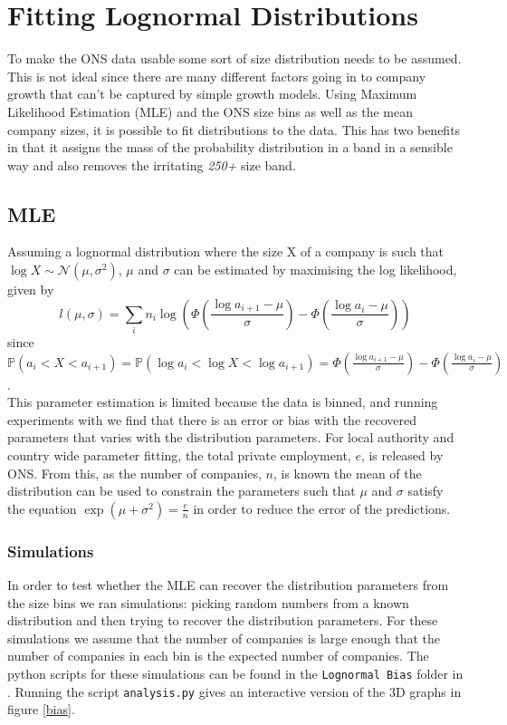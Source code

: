 \documentclass[a4paper,10pt]{article}
\begin{document}
   \section{Fitting Lognormal Distributions}
   To make the ONS data usable some sort of size distribution needs to be assumed. This is not ideal since there are many different factors going in to company growth that can't be captured by simple growth models. Using Maximum Likelihood Estimation (MLE) and the ONS size bins as well as the mean company sizes, it is possible to fit distributions to the data. This has two benefits in that it assigns the mass of the probability distribution in a band in a sensible way and also removes the irritating \emph{250+} size band.
   
   \subsection{MLE}
  
   Assuming a lognormal distribution where the size X of a company is such that $\log X \sim \mathcal{N}(\mu, \sigma^2)$, $\mu$ and $\sigma$ can be estimated by maximising the log likelihood, given by
   \begin{equation}
   l(\mu, \sigma) = \sum_i n_i \log \left( \Phi \left( \frac{\log a_{i + 1} - \mu}{\sigma} \right) - \Phi \left( \frac{\log a_{i} - \mu}{\sigma} \right) \right)
   \end{equation}
   since $\mathbb{P}(a_i < X < a_{i + 1}) = \mathbb{P}(\log a_i < \log X < \log a_{i + 1}) = \Phi \left( \frac{\log a_{i + 1} - \mu}{\sigma} \right) - \Phi \left( \frac{\log a_{i} - \mu}{\sigma} \right)$. \\
   This parameter estimation is limited because the data is binned, and running experiments with we find that there is an error or bias with the recovered parameters that varies with the distribution parameters. For local authority and country wide parameter fitting, the total private employment, $e$, is released by ONS. From this, as the number of companies, $n$, is known the mean of the distribution can be used to constrain the parameters such that $\mu$ and $\sigma$ satisfy the equation $\exp(\mu + \sigma^2) = \frac{e}{n}$ in order to reduce the error of the predictions.

   \subsubsection{Simulations}

   In order to test whether the MLE can recover the distribution parameters from the size bins we ran simulations: picking random numbers from a known distribution and then trying to recover the distribution parameters. For these simulations we assume that the number of companies is large enough that the number of companies in each bin is the expected number of companies. The python scripts for these simulations can be found in the \texttt{Lognormal Bias} folder in \cite{github}. Running the script \texttt{analysis.py} gives an interactive version of the 3D graphs in figure \ref{bias}.
\end{document}
